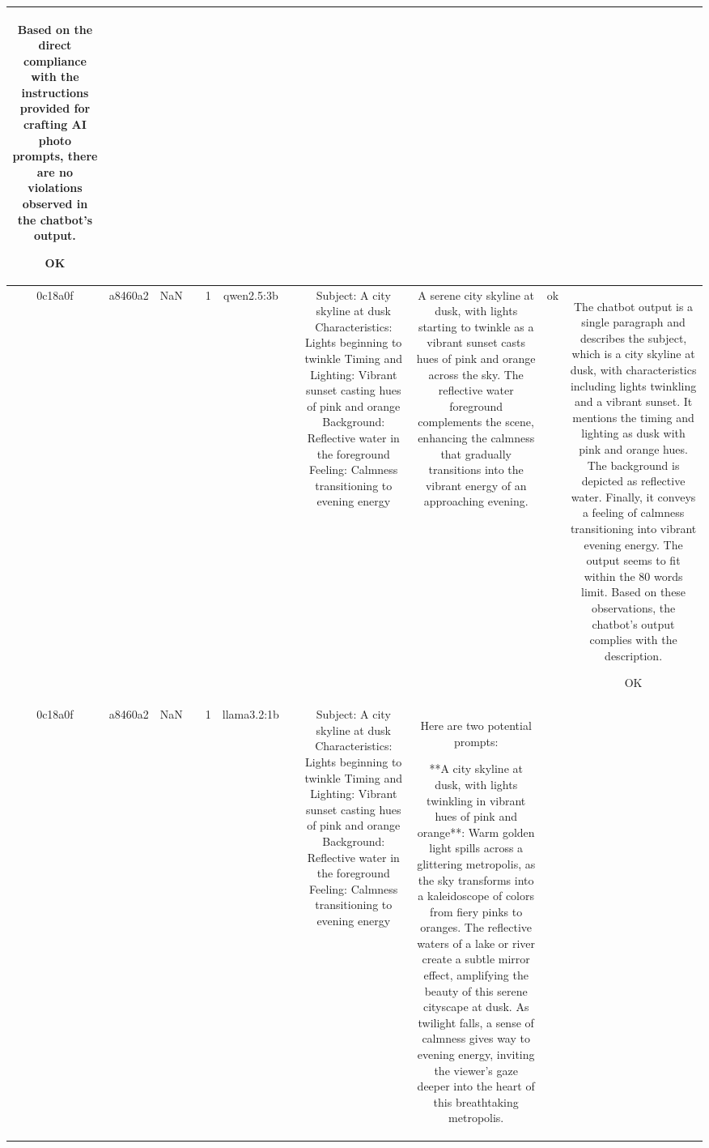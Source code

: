 \begin{table}[h!]
\begin{tabular}{|c|c|c|c|c|c|c|c|c|c|c|}
Based on the direct compliance with the instructions provided for crafting AI photo prompts, there are no violations observed in the chatbot's output.

OK\\
\hline
0c18a0f & a8460a2 & NaN &  & 1 & qwen2.5:3b &  & Subject: A city skyline at dusk  
Characteristics: Lights beginning to twinkle  
Timing and Lighting: Vibrant sunset casting hues of pink and orange  
Background: Reflective water in the foreground  
Feeling: Calmness transitioning to evening energy & A serene city skyline at dusk, with lights starting to twinkle as a vibrant sunset casts hues of pink and orange across the sky. The reflective water foreground complements the scene, enhancing the calmness that gradually transitions into the vibrant energy of an approaching evening. & ok & The chatbot output is a single paragraph and describes the subject, which is a city skyline at dusk, with characteristics including lights twinkling and a vibrant sunset. It mentions the timing and lighting as dusk with pink and orange hues. The background is depicted as reflective water. Finally, it conveys a feeling of calmness transitioning into vibrant evening energy. The output seems to fit within the 80 words limit. Based on these observations, the chatbot's output complies with the description.

OK\\
\hline
0c18a0f & a8460a2 & NaN &  & 1 & llama3.2:1b &  & Subject: A city skyline at dusk  
Characteristics: Lights beginning to twinkle  
Timing and Lighting: Vibrant sunset casting hues of pink and orange  
Background: Reflective water in the foreground  
Feeling: Calmness transitioning to evening energy & Here are two potential prompts:

**A city skyline at dusk, with lights twinkling in vibrant hues of pink and orange**: Warm golden light spills across a glittering metropolis, as the sky transforms into a kaleidoscope of colors from fiery pinks to oranges. The reflective waters of a lake or river create a subtle mirror effect, amplifying the beauty of this serene cityscape at dusk. As twilight falls, a sense of calmness gives way to evening energy, inviting the viewer's gaze deeper into the heart of this breathtaking metropolis.


\end{tabular}
\end{table}
